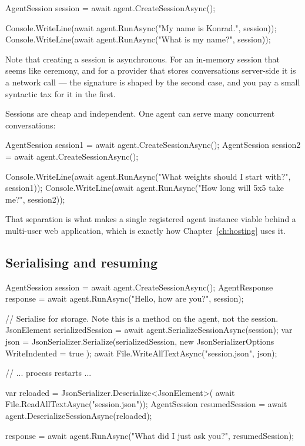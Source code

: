 \begin{csharp}[caption={A session makes the conversation continuous}, label={lst:session-basic}]
AgentSession session = await agent.CreateSessionAsync();

Console.WriteLine(await agent.RunAsync("My name is Konrad.", session));
Console.WriteLine(await agent.RunAsync("What is my name?", session));
\end{csharp}

Note that creating a session is asynchronous. For an in-memory session that seems
like ceremony, and for a provider that stores conversations server-side it is a
network call --- the signature is shaped by the second case, and you pay a small
syntactic tax for it in the first.

Sessions are cheap and independent. One agent can serve many concurrent
conversations:

\begin{csharp}[caption={One agent, two independent conversations}, label={lst:two-sessions}]
AgentSession session1 = await agent.CreateSessionAsync();
AgentSession session2 = await agent.CreateSessionAsync();

Console.WriteLine(await agent.RunAsync("What weights should I start with?", session1));
Console.WriteLine(await agent.RunAsync("How long will 5x5 take me?", session2));
\end{csharp}

That separation is what makes a single registered agent instance viable behind a
multi-user web application, which is exactly how Chapter~\ref{ch:hosting} uses it.

\subsection{Serialising and resuming}

\begin{csharp}[caption={A conversation that survives the process}, label={lst:session-serialize}]
AgentSession session = await agent.CreateSessionAsync();
AgentResponse response = await agent.RunAsync("Hello, how are you?", session);

// Serialise for storage. Note this is a method on the agent, not the session.
JsonElement serializedSession = await agent.SerializeSessionAsync(session);
var json = JsonSerializer.Serialize(serializedSession,
    new JsonSerializerOptions { WriteIndented = true });
await File.WriteAllTextAsync("session.json", json);

// ... process restarts ...

var reloaded = JsonSerializer.Deserialize<JsonElement>(
    await File.ReadAllTextAsync("session.json"));
AgentSession resumedSession = await agent.DeserializeSessionAsync(reloaded);

response = await agent.RunAsync("What did I just ask you?", resumedSession);
\end{csharp}

